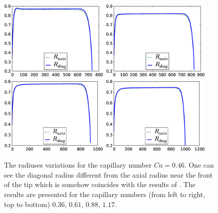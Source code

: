 \documentclass{article}
\begin{document}
\begin{figure}[ht]
\includegraphics[width=0.47\textwidth]{Figures/bubble_length_ca_36.eps}\hfill
\includegraphics[width=0.47\textwidth]{Figures/bubble_length_ca_61.eps}\\
\includegraphics[width=0.47\textwidth]{Figures/bubble_length_ca_88.eps}\hfill
\includegraphics[width=0.47\textwidth]{Figures/bubble_length_ca_117.eps}\\
\caption{The radiuses variations for the capillary number $Ca=0.46$.
One can see the diagonal radius different from the axial radius near the front of the tip which is
somehow coincides with the results of
\citet{heil-threedim}. The results are presented for the
capillary numbers (from left to right, top to bottom)
$0.36$, $0.61$, $0.88$, $1.17$. \label{fig:bubble:variation:capillaries}}
\end{figure}
\end{document}
